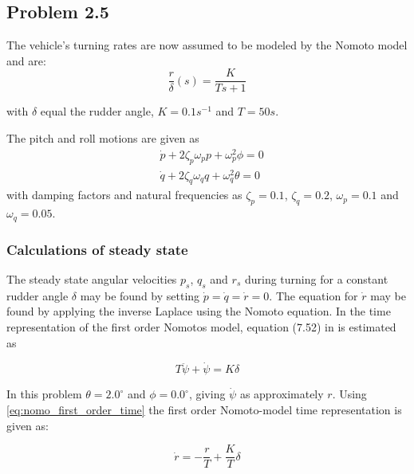\subsection*{Problem 2.5}

The vehicle's turning rates are now assumed to be modeled by the Nomoto model and are:
\begin{equation}
	\frac{r}{\delta} (s) = \frac{K}{Ts+1}
\end{equation}

with $\delta$ equal the rudder angle, $K =0.1 s^{-1}$ and $T = 50s$.

The pitch and roll motions are given as
\begin{equation}
\begin{aligned}
	&\dot{p} + 2\zeta_p\omega_p p + \omega_p^2 \phi = 0\\
	&\dot{q} + 2\zeta_q\omega_q q + \omega_q^2 \theta = 0
	\label{eq:p_q_dot}
\end{aligned}
\end{equation}
with damping factors and natural frequencies as $\zeta_p = 0.1 $, $\zeta_q = 0.2 $, $\omega_p = 0.1 $ and $\omega_q = 0.05 $. 

\subsubsection*{Calculations of steady state}

The steady state angular velocities $p_s$, $q_s$ and $r_s$ during turning for a constant rudder angle $\delta$ may be found by setting $\dot{p}= \dot{q} = \dot{r} = 0$. The equation for $\dot{r}$ may be found by applying the inverse Laplace using the Nomoto equation. In \cite{Fossen2011} the time representation of the first order Nomotos model, equation (7.52) in \cite{Fossen2011} is estimated as 

\begin{equation}
    T\ddot{\psi} + \dot{\psi} = K \delta
    \label{eq:nomo_first_order_time}
\end{equation}

In this problem $\theta = 2.0 ^\circ$ and $\phi = 0.0 ^\circ$, giving $\dot{\psi}$ as approximately $r$. Using \eqref{eq:nomo_first_order_time} the  first order Nomoto-model time representation is given as:

\begin{equation}
    \dot{r} = - \frac{r}{T} +  \frac{K}{T} \delta
    \label{eq:r_time}
\end{equation}

